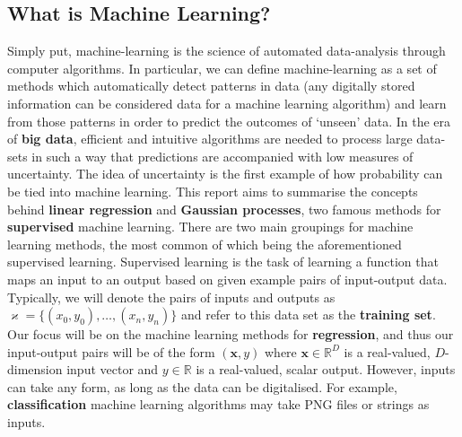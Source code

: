 \documentclass[10pt,a4paper]{article}
\numberwithin{equation}{section}
\theoremstyle{plain}
\theoremstyle{own}
\begin{document}
\subsection*{What is Machine Learning?}
Simply put, machine-learning is the science of automated data-analysis through computer algorithms. In particular, we can define machine-learning as a set of methods which automatically detect patterns in data (any digitally stored information can be considered data for a machine learning algorithm) and learn from those patterns in order to predict the outcomes of `unseen' data. In the era of \textbf{big data}, efficient and intuitive algorithms are needed to process large data-sets in such a way that predictions are accompanied with low measures of uncertainty. The idea of uncertainty is the first example of how probability can be tied into machine learning. This report aims to summarise the concepts behind \textbf{linear regression} and \textbf{Gaussian processes}, two famous methods for \textbf{supervised} machine learning. There are two main groupings for machine learning methods, the most common of which being the aforementioned supervised learning. Supervised learning is the task of learning a function that maps an input to an output based on given example pairs of input-output data. Typically, we will denote the pairs of inputs and outputs as $\varkappa = \{ (x_0,y_0), \ldots, (x_n, y_n) \}$ and refer to this data set as the \textbf{training set}. Our focus will be on the machine learning methods for \textbf{regression}, and thus our input-output pairs will be of the form $(\mathbf{x}, y)$ where $\mathbf{x} \in \mathbb{R}^D$ is a real-valued, $D$-dimension input vector and $y \in \mathbb{R}$ is a real-valued, scalar output. However, inputs can take any form, as long as the data can be digitalised. For example, \textbf{classification} machine learning algorithms may take PNG files or strings as inputs.
\end{document}
